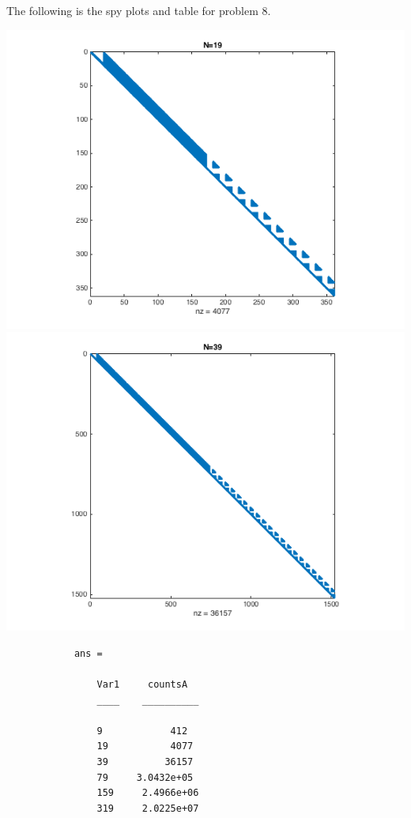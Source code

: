 \documentclass[11pt, oneside, titlepage]{article}
\begin{document}
\begin{enumerate}
        The following is the spy plots and table for problem 8.
        \begin{center}
            \includegraphics[scale=.5]{Figures/03_8_1.png}
            \includegraphics[scale=.5]{Figures/03_8_2.png}
        \end{center}

        \begin{verbatim}
            ans = 

                Var1     countsA  
                ____    __________

                9            412
                19           4077
                39          36157
                79     3.0432e+05
                159     2.4966e+06
                319     2.0225e+07
        \end{verbatim}


\end{enumerate}
\end{document}
